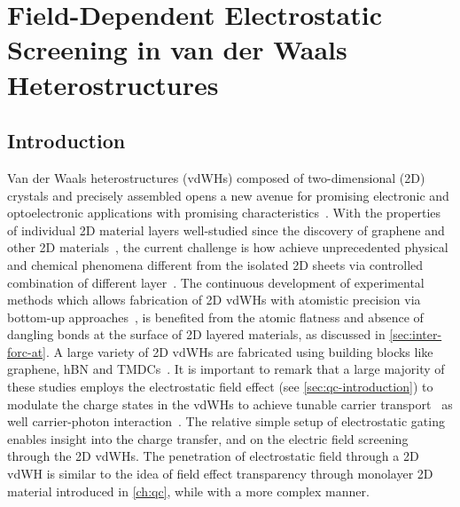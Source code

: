 \chapter{Field-Dependent Electrostatic Screening in van der Waals Heterostructures}
\label{ch:asym}
\renewcommand*\imgdir{img/asym/}


\vspace{1em}


\newcommand*{\E}{\mathscr{E}}


\section{Introduction}
\label{sec:asym-introduction}


Van der Waals heterostructures (vdWHs) composed of two-dimensional
(2D) crystals and precisely assembled opens a new avenue for promising
electronic and optoelectronic applications with promising
characteristics~\autocite{Geim_2013_2D_vdw_Het,Jariwala_2016_mixed_vdw_het,Novoselov_2016_vdW,Liu_2016_rev,Withers_2015_LED_vde_Het,Britnell_2012_FET}.
%
With the properties of individual 2D material layers well-studied
since the discovery of graphene and other 2D
materials~\autocite{Novoselov_2005_2D_crystal},
%
the current challenge is how achieve unprecedented physical and chemical
phenomena different from the isolated 2D sheets via controlled
combination of different layer~\autocite{Geim_2013_2D_vdw_Het}.
%
The continuous development of experimental methods which allows
fabrication of 2D vdWHs with atomistic precision via bottom-up
approaches~\autocite{Jariwala_2016_mixed_vdw_het,Novoselov_2016_vdW,Liu_2016_rev},
is benefited from the
atomic flatness and absence of dangling bonds at the surface of 2D
layered materials, as discussed in \autoref{sec:inter-forc-at}.
%
A large variety of 2D vdWHs are fabricated using building
blocks like graphene, hBN and
TMDCs~\autocite{Dean_2010_BN_gr_highquality,Xue_2011_STM,Withers_2015_LED_vde_Het,Britnell_2012_FET,Cui_2015_multiterm_mos2}.
%
It is important to remark that a large majority of these studies
employs the electrostatic field effect (see
\autoref{sec:qc-introduction}) to modulate the charge states in the
vdWHs to achieve tunable carrier
transport~\autocite{Britnell_2012_FET,Dean_2013_butterfly} as well
carrier-photon
interaction~\autocite{Britnell_2013_vdWE,Withers_2015_LED_vde_Het}.
%
%
The relative simple setup of electrostatic gating enables insight into the charge transfer, and on the
electric field screening through the 2D vdWHs.
%
The penetration of electrostatic field through a 2D vdWH is similar to the idea of field effect transparency through mono\-layer 2D material introduced in
\autoref{ch:qc}, while with a more complex manner.

